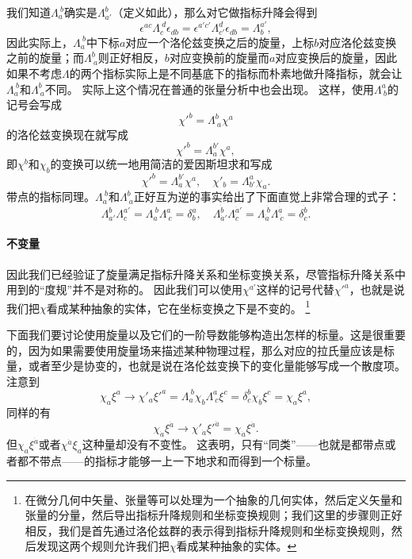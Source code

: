 \documentclass[hyperref, UTF8, a4paper]{ctexart}
\begin{document}
我们知道$\Lambda_a^{\ b}$确实是$\Lambda_{a'}^{b}$（定义如此），那么对它做指标升降会得到
\[
    \epsilon^{ac} \Lambda_c^{\ d} \epsilon_{db} = \epsilon^{a' c'} \Lambda_{c'}^{d} \epsilon_{db} = \Lambda^{a'}_b,
\]
因此实际上，$\Lambda_a^{\ b}$中下标$a$对应一个洛伦兹变换之后的旋量，上标$b$对应洛伦兹变换之前的旋量；而$\Lambda_{\ a}^b$则正好相反，$b$对应变换前的旋量而$a$对应变换后的旋量，因此如果不考虑$\Lambda$的两个指标实际上是不同基底下的指标而朴素地做升降指标，就会让$\Lambda_a^{\ b}$和$\Lambda^b_{\ a}$不同。
实际上这个情况在普通的张量分析中也会出现。
这样，使用$\Lambda^a_{\ b}$的记号会写成
\[
    \chi'^b = \Lambda^b_{\ a} \chi^a
\]
的洛伦兹变换现在就写成
\[
    \chi'^b = \Lambda_a^{b'} \chi^a,
\]
即$\chi^b$和$\chi_b$的变换可以统一地用简洁的爱因斯坦求和写成
\[
    \chi'^b = \Lambda_a^{b'} \chi^a, \quad \chi'_b = \Lambda_{b'}^a \chi_a.
\]
带点的指标同理。$\Lambda_a^{\ b}$和$\Lambda^b_{\ a}$正好互为逆的事实给出了下面直觉上非常合理的式子：
\begin{equation}
    \Lambda_{a'}^b \Lambda^{a'}_c = \Lambda_a^{\ b} \Lambda^a_{\ c} = \delta_b^a, \quad \Lambda_{\dot{a}'}^{\dot{b}} \Lambda^{\dot{a}'}_{\dot{c}} = \Lambda_{\dot{a}}^{\ \dot{b}} \Lambda^{\dot{a}}_{\ \dot{c}} = \delta_{\dot{c}}^{\dot{b}}.
\end{equation}

\paragraph{不变量} 因此我们已经验证了旋量满足指标升降关系和坐标变换关系，尽管指标升降关系中用到的“度规”并不是对称的。
因此我们可以使用$\chi^{a'}$这样的记号代替${\chi'}^{a}$，也就是说我们把$\chi$看成某种抽象的实体，它在坐标变换之下是不变的。%
\footnote{在微分几何中矢量、张量等可以处理为一个抽象的几何实体，然后定义矢量和张量的分量，然后导出指标升降规则和坐标变换规则；我们这里的步骤则正好相反，我们是首先通过洛伦兹群的表示得到指标升降规则和坐标变换规则，然后发现这两个规则允许我们把$\chi$看成某种抽象的实体。}%

下面我们要讨论使用旋量以及它们的一阶导数能够构造出怎样的标量。这是很重要的，因为如果需要使用旋量场来描述某种物理过程，那么对应的拉氏量应该是标量，或者至少是协变的，也就是说在洛伦兹变换下的变化量能够写成一个散度项。
注意到
\[
    \chi_a \xi^a \longrightarrow \chi'_a {\xi'}^a = \Lambda_a^{\ b} \chi_b \Lambda^a_{\ c} \xi^c = \delta_c^b \chi_b \xi^c = \chi_a \xi^a,
\]
同样的有
\[
    \chi_{\dot{a}} \xi^{\dot{a}} \longrightarrow \chi'_{\dot{a}} {\xi'}^{\dot{a}} = \chi_{\dot{a}} \xi^{\dot{a}}.
\]
但$\chi_a \xi^{\dot{a}}$或者$\chi^{\dot{a}} \xi_a$这种量却没有不变性。
这表明，只有“同类”——也就是都带点或者都不带点——的指标才能够一上一下地求和而得到一个标量。
\end{document}
